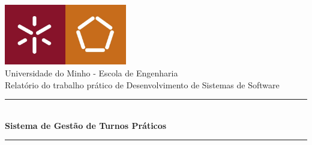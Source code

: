 \documentclass[a4paper]{article}
\begin{document}
\begin{titlepage}
\begin{center}


\includegraphics[width=0.4\textwidth]{logo}\\[0.3cm]

{\large Universidade do Minho - Escola de Engenharia}\\[0.5cm]

{\large Relatório do trabalho prático de Desenvolvimento de Sistemas de Software}\\[0.5cm]

\begin{abstract}

Neste relatório será feita uma abordagem inicial ao projeto de Desenvolvimentos de Sistemas de Software ao qual está associado o desenvolvimento de um programa, em Java, responsável pela gestão dos turnos de um curso. Assim, este documento apresenta detalhadamente a perspetiva tomada pelo grupo em relação ao problema proposto pela equipa docente de DSS.

\hspace{3mm}
\end{abstract}

\rule{\linewidth}{0.5mm} \\[0.4cm]
{ \huge \bfseries Sistema de Gestão de Turnos Práticos \\[0.4cm] }
\rule{\linewidth}{0.5mm} \\[1.5cm]


\end{center}
\end{titlepage}
\end{document}
